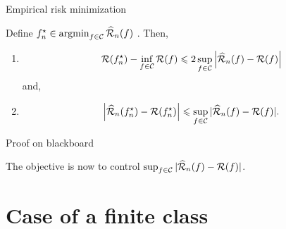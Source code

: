\documentclass[xcolor={usenames,dvipsnames},handout]{beamer}
\newtheorem{remark}[theorem]{Remark}
\begin{document}
\begin{frame}{Empirical risk minimization}
\begin{lemma}
\label{lem:estim_term}
Define $f_n^\star \in \operatorname{argmin}_{f\in \mathcal{C}} \widehat{{\mathcal{R}}}_n(f)$ . Then,
\begin{enumerate}
\item $${\mathcal{R}}(f_n^\star) - \inf_{f\in \mathcal{C}} {\mathcal{R}}(f) \leqslant 2  \sup_{f\in \mathcal{C}} \left| \widehat{{\mathcal{R}}}_n (f) - {\mathcal{R}}(f)  \right|  $$
and,
\item
$$
\left| \widehat{{\mathcal{R}}}_n (f_n^\star) - {\mathcal{R}} (f_n^\star) \right| \leqslant \sup_{f\in \mathcal{C}} | \widehat{{\mathcal{R}}}_n(f) - {\mathcal{R}}(f) |.
$$ 
\end{enumerate}
\end{lemma}

\vspace{.3cm}

\centering 
{\color{Vert} Proof on blackboard}

\vspace{.3cm}

The objective is now to control $\sup_{f\in \mathcal{C}} | \widehat{{\mathcal{R}}}_n(f) - {\mathcal{R}}(f) |$.

%
\end{frame}

%
%
%


\section{Case of a finite class}
\label{sec:C_finie}
\end{document}
